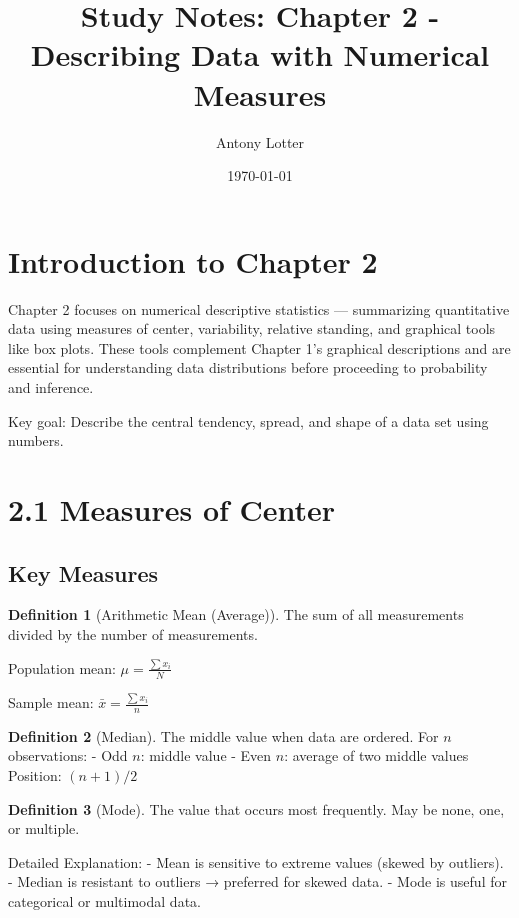 \documentclass{article}
\title{Study Notes: Chapter 2 - Describing Data with Numerical Measures}
\author{Antony Lotter}
\date{\today}
\theoremstyle{definition}
\newtheorem{definition}{Definition}
\begin{document}
	
	\maketitle
	
	\section{Introduction to Chapter 2}
	
	Chapter 2 focuses on numerical descriptive statistics — summarizing quantitative data using measures of center, variability, relative standing, and graphical tools like box plots. These tools complement Chapter 1's graphical descriptions and are essential for understanding data distributions before proceeding to probability and inference.
	
	Key goal: Describe the central tendency, spread, and shape of a data set using numbers.
	
	\section{2.1 Measures of Center}
	
	\subsection{Key Measures}
	
	\begin{definition}[Arithmetic Mean (Average)]
		The sum of all measurements divided by the number of measurements.
	\end{definition}
	
	Population mean: \(\mu = \frac{\sum x_i}{N}\)
	
	Sample mean: \(\bar{x} = \frac{\sum x_i}{n}\)
	
	\begin{definition}[Median]
		The middle value when data are ordered. For \(n\) observations:
		- Odd \(n\): middle value
		- Even \(n\): average of two middle values
		Position: \((n+1)/2\)
	\end{definition}
	
	\begin{definition}[Mode]
		The value that occurs most frequently. May be none, one, or multiple.
	\end{definition}
	
	Detailed Explanation: 
	- Mean is sensitive to extreme values (skewed by outliers).
	- Median is resistant to outliers → preferred for skewed data.
	- Mode is useful for categorical or multimodal data.
	
\end{document}
